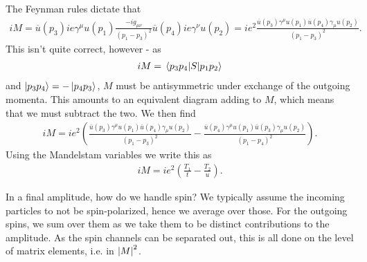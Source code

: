 The Feynman rules dictate that
\begin{align*}
	iM = \overline{u}(p_{3})ie\gamma^{\mu}u(p_{1})\frac{-ig_{\mu\nu}}{(p_{1} - p_{3})^{2}}\overline{u}(p_{4})ie\gamma^{\nu}u(p_{2}) = ie^{2}\frac{\overline{u}(p_{3})\gamma^{\mu}u(p_{1})\overline{u}(p_{4})\gamma_{\mu}u(p_{2})}{(p_{1} - p_{3})^{2}}.
\end{align*}
This isn't quite correct, however - as
\begin{align*}
	iM = \mel{p_{3}p_{4}}{S}{p_{1}p_{2}}
\end{align*}
and $\ket{p_{3}p_{4}} = -\ket{p_{4}p_{3}}$, $M$ must be antisymmetric under exchange of the outgoing momenta. This amounts to an equivalent diagram adding to $M$, which means that we must subtract the two. We then find
\begin{align*}
	iM = ie^{2}\left(\frac{\overline{u}(p_{3})\gamma^{\mu}u(p_{1})\overline{u}(p_{4})\gamma_{\mu}u(p_{2})}{(p_{1} - p_{3})^{2}} - \frac{\overline{u}(p_{4})\gamma^{\mu}u(p_{1})\overline{u}(p_{3})\gamma_{\mu}u(p_{2})}{(p_{1} - p_{4})^{2}}\right).
\end{align*}
Using the Mandelstam variables we write this as
\begin{align*}
	iM = ie^{2}\left(\frac{T_{1}}{t} - \frac{T_{2}}{u}\right).
\end{align*}

In a final amplitude, how do we handle spin? We typically assume the incoming particles to not be spin-polarized, hence we average over those. For the outgoing spins, we sum over them as we take them to be distinct contributions to the amplitude. As the spin channels can be separated out, this is all done on the level of matrix elements, i.e. in $\abs{M}^{2}$.

